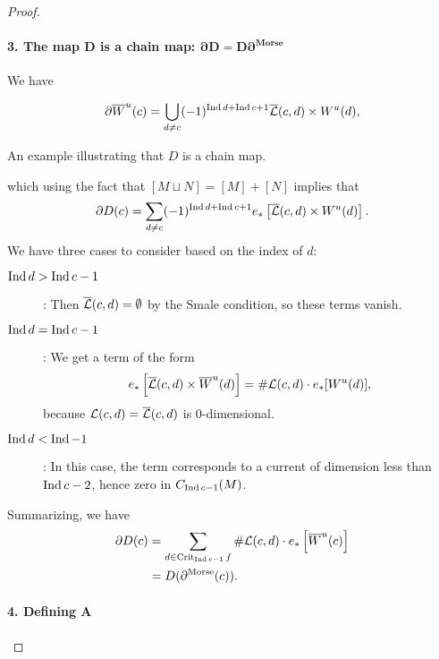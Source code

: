 \begin{proof}
    \paragraph{3. The map $\bm{D}$ is a chain map:  $\bm{\partial D = D \partial^{\text{Morse}}}$ }
    We have

    \[
        \partial \overline{W}^u(c) = \bigcup_{d \neq c}  (-1)^{\operatorname{Ind} d + \operatorname{Ind} c + 1} \overline{\mathcal L}(c, d) \times  W^u(d),
    \]
    \begin{marginfigure}
        \centering
        \caption{An example illustrating that $D$ is a chain map.}
        \label{fig:d-is-a-chain-map}
    \end{marginfigure}
    which using the fact that $[M \sqcup N] = [M] + [N]$ implies that
    \[
        \partial D(c) = \sum_{d \neq c} (-1)^{\operatorname{Ind} d + \operatorname{Ind} c + 1} e_*\left[\overline{\mathcal L}(c, d) \times  W^u(d)\right]
    .\] 
    We have three cases to consider based on the index of $d$:
    \begin{description}
        \item[$\operatorname{Ind} d > \operatorname{Ind} c-1$]: Then $\overline{\mathcal L}(c, d) = \emptyset$ by the Smale condition, so these terms vanish.
        \item[$\operatorname{Ind} d = \operatorname{Ind} c-1$]: We get a term of the form \[
            e_* \left[\overline{\mathcal L}(c, d) \times \overline{W}^u(d)\right] = \# \mathcal L(c, d) \cdot e_*[W^u(d)],\]
            because $\mathcal L(c, d) = \overline{\mathcal L}(c, d)$ is  $0$-dimensional.
        \item[$\operatorname{Ind} d < \operatorname{Ind} -1$]: In this case, the term corresponds to a current of dimension less than $\operatorname{Ind} c - 2$, hence zero in $C_{\operatorname{Ind} c - 1}(M)$.
    \end{description}
    Summarizing, we have
    \begin{align*}
        \partial D(c) &= \sum_{d \in \operatorname{Crit}_{\operatorname{Ind} c - 1} f} \# \mathcal L(c, d) \cdot e_* \left[ \overline{W}^u(c) \right] \\
                      &= D(\partial^{\text{Morse}}(c))
    .\end{align*} 

    \paragraph{4. Defining $\bm{A}$}


\end{proof}
